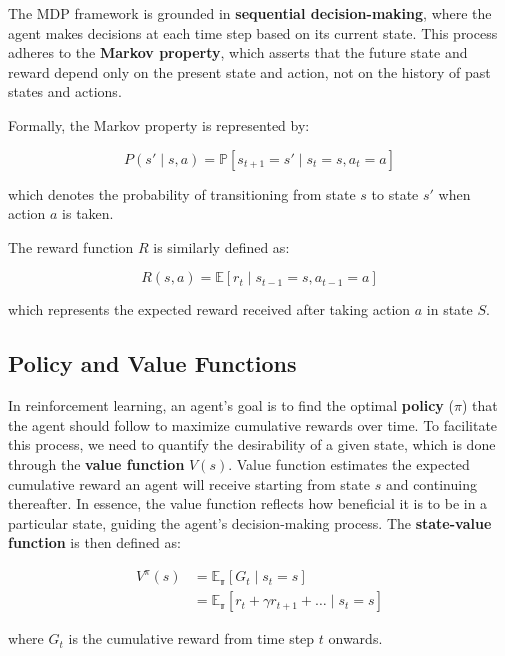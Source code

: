 The MDP framework is grounded in \textbf{sequential decision-making}, where the
agent makes decisions at each time step based on its current state. This
process adheres to the \textbf{Markov property}, which asserts that the future
state and reward depend only on the present state and action, not on the
history of past states and actions\cite{bg2}.

Formally, the Markov property is represented by:

\begin{equation}
    P(s'\mid s, a) = \mathbb{P}[s_{t+1} = s' \mid s_t = s, a_t = a]
\end{equation}

which denotes the probability of transitioning from state $s$ to state $s'$
when action $a$ is taken.

The reward function \( R \) is similarly defined as:

\begin{equation}
    R(s, a) = \mathbb{E}[r_t \mid s_{t-1} = s, a_{t-1} = a]
\end{equation}

which represents the expected reward received after taking action $a$ in state
$S$.
\subsection{Policy and Value Functions}
In reinforcement learning, an agent's goal is to find the optimal \textbf{policy} ($\pi$) that
the agent should follow to maximize cumulative rewards over time. To facilitate
this process, we need to quantify the desirability of a given state, which is
done through the \textbf{value function} $V(s)$. Value function estimates the
expected cumulative reward an agent will receive starting from state \( s \)
and continuing thereafter. In essence, the value function reflects how
beneficial it is to be in a particular state, guiding the agent's
decision-making process. The \textbf{state-value function} is then defined as:

\begin{equation}\label{eq:v_pi}
    \begin{split}
        V^\pi(s) & = \mathbb{E_\pi}[G_t \mid s_t = s]                            \\
                 & = \mathbb{E_\pi}[r_t + \gamma r_{t+1}  + \ldots \mid s_t = s]
    \end{split}
\end{equation}

where \( G_t \) is the cumulative reward from time step $t$ onwards\cite{bg2}. \\

